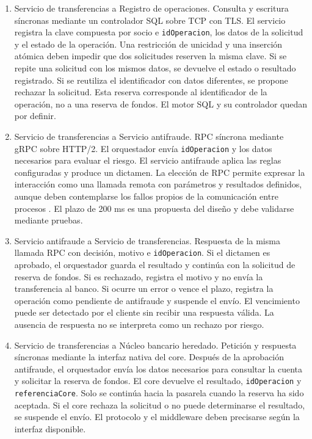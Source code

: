 \documentclass[12pt,a4paper]{article}
\begin{document}
\begin{enumerate}

    \item Servicio de transferencias a Registro de operaciones.
    Consulta y escritura síncronas mediante un controlador SQL
    sobre TCP con TLS. El servicio registra la clave compuesta
    por socio e \texttt{idOperacion}, los datos de la solicitud
    y el estado de la operación. Una restricción de unicidad y
    una inserción atómica deben impedir que dos solicitudes
    reserven la misma clave. Si se repite una solicitud con
    los mismos datos, se devuelve el estado o resultado
    registrado. Si se reutiliza el identificador con datos
    diferentes, se propone rechazar la solicitud. Esta reserva
    corresponde al identificador de la operación, no a una
    reserva de fondos. El motor SQL y su controlador quedan
    por definir.

    \item Servicio de transferencias a Servicio antifraude.
    RPC síncrona mediante gRPC sobre HTTP/2. El orquestador
    envía \texttt{idOperacion} y los datos necesarios para
    evaluar el riesgo. El servicio antifraude aplica las
    reglas configuradas y produce un dictamen. La elección
    de RPC permite expresar la interacción como una llamada
    remota con parámetros y resultados definidos, aunque
    deben contemplarse los fallos propios de la comunicación
    entre procesos \cite{birrell1984}.
    El plazo de 200 ms es una propuesta del diseño y debe
    validarse mediante pruebas.

    \item Servicio antifraude a Servicio de transferencias.
    Respuesta de la misma llamada RPC con decisión, motivo
    e \texttt{idOperacion}. Si el dictamen es aprobado,
    el orquestador guarda el resultado y continúa con la
    solicitud de reserva de fondos. Si es rechazado, registra
    el motivo y no envía la transferencia al banco. Si ocurre
    un error o vence el plazo, registra la operación como
    pendiente de antifraude y suspende el envío. El vencimiento
    puede ser detectado por el cliente sin recibir una
    respuesta válida. La ausencia de respuesta no se
    interpreta como un rechazo por riesgo.

    \item Servicio de transferencias a Núcleo bancario
    heredado.
    Petición y respuesta síncronas mediante la interfaz nativa
    del core. Después de la aprobación antifraude, el
    orquestador envía los datos necesarios para consultar
    la cuenta y solicitar la reserva de fondos. El core
    devuelve el resultado, \texttt{idOperacion} y
    \texttt{referenciaCore}. Solo se continúa hacia la
    pasarela cuando la reserva ha sido aceptada. Si el core
    rechaza la solicitud o no puede determinarse el resultado,
    se suspende el envío. El protocolo y el middleware deben
    precisarse según la interfaz disponible.


\end{enumerate}
\end{document}
